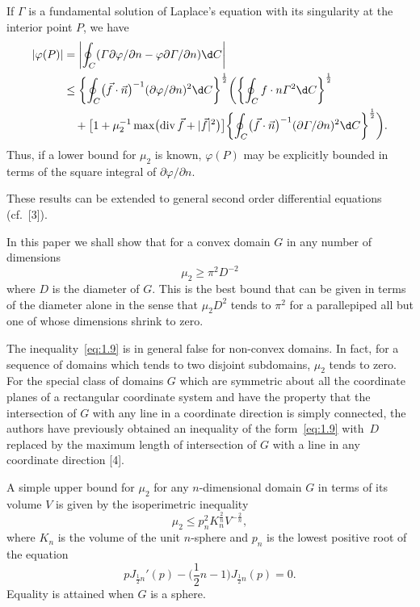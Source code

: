 \documentclass{article}
\theoremstyle{remarks}
\renewcommand{\div}{\operatorname{div}}
\begin{document}
If $\varGamma$ is a fundamental solution of Laplace's equation with its singularity
at the interior point $P$, we have
\begin{equation}\label{eq:1.8}
  \begin{aligned}
  |\varphi(P)|
    & = \biggl|\oint_C (\varGamma \partial\varphi/\partial n - \varphi \partial\varGamma/\partial n)
        \d C \biggr| \\
    & \leq \biggl\{ \oint_C \bigl(\vec{f}\cdot\vec{n}\bigr)^{-1}
        (\partial\varphi/\partial n)^2 \d C \biggr\}^{\frac12}
        \biggl(\biggl\{\oint_C f\cdot n \varGamma^2 \d C\biggr\}^{\frac12} \\
    & \quad + \bigl[1+\mu_2^{-1}\max\bigl(\div\vec{f}+|\vec{f}|^2\bigr)\bigr]
        \biggl\{\oint_C \bigl(\vec{f}\cdot\vec{n}\bigr)^{-1}
          (\partial\varGamma/\partial n)^2 \d C\biggr\}^{\frac12} \biggr).
  \end{aligned}
\end{equation}
Thus, if a lower bound for $\mu_2$ is known, $\varphi(P)$ may be explicitly
bounded in terms of the square integral of $\partial\varphi/\partial n$.

These results can be extended to general second order differential equations (cf.~[3]).

In this paper we shall show that for a convex domain $G$ in any number of
dimensions
\begin{equation}\label{eq:1.9}
  \mu_2 \geq \pi^2D^{-2}
\end{equation}
where $D$ is the diameter of $G$.
This is the best bound that can be given in terms of the diameter alone in
the sense that $\mu_2 D^2$ tends to $\pi^2$ for a parallepiped all
but one of whose dimensions shrink to zero.

The inequality~\eqref{eq:1.9} is in general false for non-convex domains.
In fact, for a sequence of domains which tends to two disjoint subdomains,
$\mu_2$ tends to zero. For the special class of domains $G$ which are
symmetric about all the coordinate planes of a rectangular coordinate
system and have the property that the intersection of $G$ with any line in a coordinate
direction is simply connected, the authors have previously obtained
an inequality of the form~\eqref{eq:1.9} with~$D$ replaced by the maximum
length of intersection of $G$ with a line in any coordinate direction [4].

A simple upper bound for $\mu_2$ for any $n$-dimensional domain $G$
in terms of its volume $V$ is given by the isoperimetric inequality
\begin{equation}\label{eq:1.10}
  \mu_2 \leq p_n^2 K_n^{\frac{2}{n}} V^{-\frac{2}{n}},
\end{equation}
where $K_n$ is the volume of the unit $n$-sphere and $p_n$
is the lowest positive root of the equation
\begin{equation}\label{eq:1.11}
  p J_{\frac12 n}'(p) - \biggl(\frac12 n - 1\biggr) J_{\frac12 n}(p) = 0.
\end{equation}
Equality is attained when $G$ is a sphere.
\end{document}
